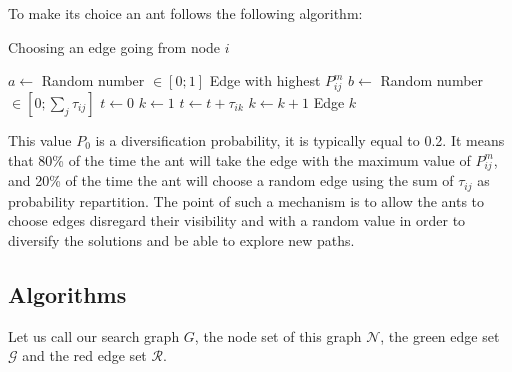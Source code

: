 \documentclass[UTF8, twoside]{EPURapport}
\begin{document}
	To make its choice an ant follows the following algorithm:
	
\begin{algorithm}
	\caption{Choosing an edge going from node $i$}
	\begin{algorithmic}[1]
		\State $a \gets $ Random number $\in \left[0;1\right]$ 
			\State \Return Edge with highest $P^m_{ij}$
		\Else
			\State $b \gets $ Random number $\in \left[0; \underset{j}{\sum}\tau_{ij}\right]$
			\State $t \gets 0$
			\State $k \gets 1$
				\State $t \gets t + \tau_{ik}$
				\State $k \gets k + 1$
			\EndWhile
			\State \Return Edge $k$
		\EndIf
	\end{algorithmic}
	\label{roulette}
\end{algorithm}

	This value $P_0$ is a diversification probability, it is typically equal to 0.2. It means that 80\% of the time the ant will take the edge with the maximum value of $P^m_{ij}$, and 20\% of the time the ant will choose a random edge using the sum of $\tau_{ij}$ as probability repartition. The point of such a mechanism is to allow the ants to choose edges disregard their visibility and with a random value in order to diversify the solutions and be able to explore new paths.

\subsection{Algorithms}

	Let us call our search graph $G$, the node set of this graph $\mathscr{N}$, the green edge set $\mathscr{G}$ and the red edge set $\mathscr{R}$. 
\end{document}
